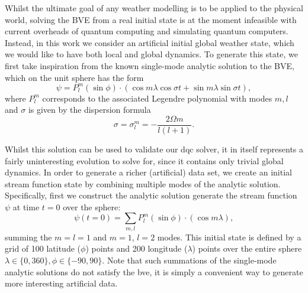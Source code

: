 \documentclass[aps,pra,a4paper,twocolumn,longbibliography,groupedaddress]{revtex4-2}
\begin{document}
Whilst the ultimate goal of any weather modelling is to be applied to the physical world, solving the BVE from a real initial state is at the moment infeasible with current overheads of quantum computing and simulating quantum computers. Instead, in this work we consider an artificial initial global weather state, which we would like to have both local and global dynamics. To generate this state, we first take inspiration from the known single-mode analytic solution to the BVE, which on the unit sphere has the form
\begin{equation}\label{eqn:general_analytic_soln}
    \psi = P^m_l (\sin \phi) \cdot (\cos m\lambda \cos \sigma t + \sin m\lambda \sin \sigma t),
\end{equation}
where $P^m_l$ corresponds to the associated Legendre polynomial with modes $m,l$ and $\sigma$ is given by the dispersion formula
\begin{equation}
    \sigma = \sigma^m_l = -\frac{2 \Omega m}{l(l+1)}.
\end{equation}

Whilst this solution can be used to validate our \gls{dqc} solver, it in itself represents a fairly uninteresting evolution to solve for, since it contains only trivial global dynamics. In order to generate a richer (artificial) data set, we create an initial stream function state by combining multiple modes of the analytic solution. Specifically, first we construct the analytic solution generate the stream function $\psi$ at time $t=0$ over the sphere:
%
\begin{equation}
    \psi(t=0) = \sum_{m,l} P^m_l (\sin \phi) \cdot (\cos m\lambda),
\end{equation}
%
summing the $m=l=1$ and $m=1$, $l=2$ modes. 
This initial state is defined by a grid of 100 latitude ($\phi$) points and 200 longitude ($\lambda$) points over the entire sphere $\lambda \in \{0, 360\}, \phi \in \{-90, 90\}$.
Note that such summations of the single-mode analytic solutions do not satisfy the \gls{bve}, it is simply a convenient way to generate more interesting artificial data. 
\end{document}
